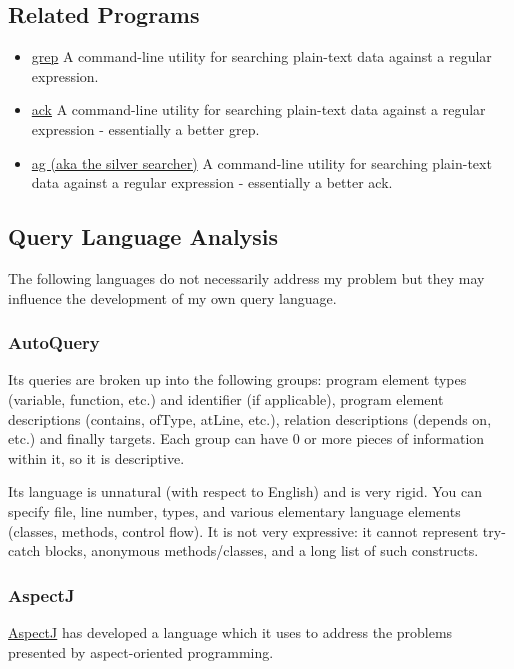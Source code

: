 \documentclass[12pt, letterpaper]{article}
\begin{document}
\subsection{Related Programs}
\begin{itemize}
  \item \href{https://en.wikipedia.org/wiki/Grep}{grep}\newline
  A command-line utility for searching plain-text data against a regular expression.
  \item \href{https://beyondgrep.com/}{ack}\newline
  A command-line utility for searching plain-text data against a regular expression - essentially a better grep.
  \item \href{https://github.com/ggreer/the_silver_searcher}{ag (aka the silver searcher)}\newline
  A command-line utility for searching plain-text data against a regular expression - essentially a better ack.
\end{itemize}

\subsection{Query Language Analysis}
The following languages do not necessarily address my problem but they may influence the development of my own query language.

\subsubsection{AutoQuery}
Its queries are broken up into the following groups: program element types (variable, function, etc.) and identifier (if applicable), program element descriptions (contains, ofType, atLine, etc.), relation descriptions (depends on, etc.) and finally targets.
Each group can have 0 or more pieces of information within it, so it is descriptive.

Its language is unnatural (with respect to English) and is very rigid.
You can specify file, line number, types, and various elementary language elements (classes, methods, control flow).
It is not very expressive: it cannot represent try-catch blocks, anonymous methods/classes, and a long list of such constructs.

\subsubsection{AspectJ}
\href{https://eclipse.org/aspectj/doc/next/progguide/starting-aspectj.html}{AspectJ} has developed a language which it uses to address the problems presented by aspect-oriented programming.  
\end{document}
